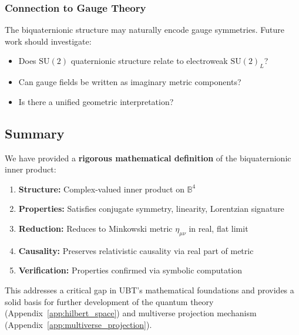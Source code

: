 \subsubsection{Connection to Gauge Theory}

The biquaternionic structure may naturally encode gauge symmetries. Future work should investigate:
\begin{itemize}
\item Does $\text{SU}(2)$ quaternionic structure relate to electroweak $\text{SU}(2)_L$?
\item Can gauge fields be written as imaginary metric components?
\item Is there a unified geometric interpretation?
\end{itemize}

\subsection{Summary}

We have provided a \textbf{rigorous mathematical definition} of the biquaternionic inner product:
\begin{enumerate}
\item \textbf{Structure:} Complex-valued inner product on $\mathbb{B}^4$
\item \textbf{Properties:} Satisfies conjugate symmetry, linearity, Lorentzian signature
\item \textbf{Reduction:} Reduces to Minkowski metric $\eta_{\mu\nu}$ in real, flat limit
\item \textbf{Causality:} Preserves relativistic causality via real part of metric
\item \textbf{Verification:} Properties confirmed via symbolic computation
\end{enumerate}

This addresses a critical gap in UBT's mathematical foundations and provides a solid basis for further development of the quantum theory (Appendix~\ref{app:hilbert_space}) and multiverse projection mechanism (Appendix~\ref{app:multiverse_projection}).

